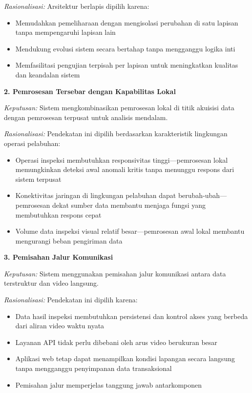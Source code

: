 \textit{Rasionalisasi:} Arsitektur berlapis dipilih karena:
\begin{itemize}
  \item Memudahkan pemeliharaan dengan mengisolasi perubahan di satu lapisan tanpa mempengaruhi lapisan lain
  \item Mendukung evolusi sistem secara bertahap tanpa mengganggu logika inti
  \item Memfasilitasi pengujian terpisah per lapisan untuk meningkatkan kualitas dan keandalan sistem
\end{itemize}

\textbf{2. Pemrosesan Tersebar dengan Kapabilitas Lokal}

\textit{Keputusan:} Sistem mengkombinasikan pemrosesan lokal di titik akuisisi data dengan pemrosesan terpusat untuk analisis mendalam.

\textit{Rasionalisasi:} Pendekatan ini dipilih berdasarkan karakteristik lingkungan operasi pelabuhan:
\begin{itemize}
  \item Operasi inspeksi membutuhkan responsivitas tinggi---pemrosesan lokal memungkinkan deteksi awal anomali kritis tanpa menunggu respons dari sistem terpusat
  \item Konektivitas jaringan di lingkungan pelabuhan dapat berubah-ubah---pemrosesan dekat sumber data membantu menjaga fungsi yang membutuhkan respons cepat
  \item Volume data inspeksi visual relatif besar---pemrosesan awal lokal membantu mengurangi beban pengiriman data
\end{itemize}

\textbf{3. Pemisahan Jalur Komunikasi}

\textit{Keputusan:} Sistem menggunakan pemisahan jalur komunikasi antara data terstruktur dan video langsung.

\textit{Rasionalisasi:} Pendekatan ini dipilih karena:
\begin{itemize}
  \item Data hasil inspeksi membutuhkan persistensi dan kontrol akses yang berbeda dari aliran video waktu nyata
  \item Layanan API tidak perlu dibebani oleh arus video berukuran besar
  \item Aplikasi web tetap dapat menampilkan kondisi lapangan secara langsung tanpa mengganggu penyimpanan data transaksional
  \item Pemisahan jalur memperjelas tanggung jawab antarkomponen
\end{itemize}

